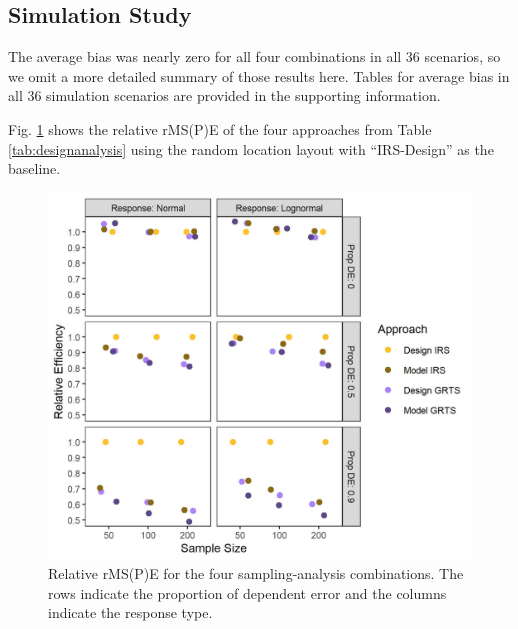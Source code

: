 \documentclass[]{elsarticle} %
\begin{document}
\hypertarget{sec:r_sim}{%
\subsection{Simulation Study}\label{sec:r_sim}}

The average bias was nearly zero for all four combinations in all 36
scenarios, so we omit a more detailed summary of those results here.
Tables for average bias in all 36 simulation scenarios are provided in
the supporting information.

Fig. \ref{fig:figeff} shows the relative rMS(P)E of the four approaches
from Table \ref{tab:designanalysis} using the random location layout
with ``IRS-Design'' as the baseline.

\begin{figure}
  \centering
  \includegraphics[width = 1\linewidth]{figures/rmspe_eff.jpeg}
  \caption{Relative rMS(P)E for the four sampling-analysis combinations. The rows indicate the proportion of dependent error and the columns indicate the response type.}
  \label{fig:figeff}
\end{figure}
\end{document}
